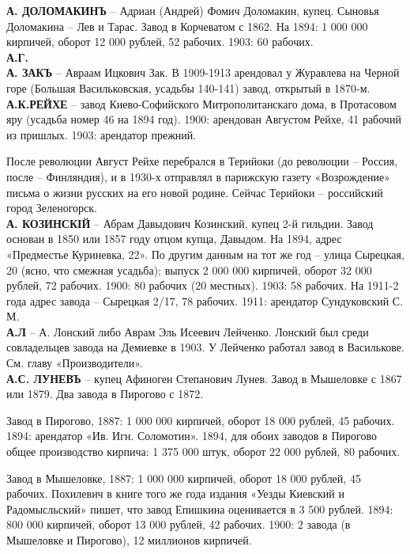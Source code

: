 \noindent\textbf{А. ДОЛОМАКИНЪ} – Адриан (Андрей) Фомич Доломакин, купец. Сыновья Доломакина – Лев и Тарас. Завод в Корчеватом с 1862. На 1894: 1 000 000 кирпичей, оборот 12 000 рублей, 52 рабочих. 1903: 60 рабочих.\\ 

\noindent\textbf{А.Г.}\\

\noindent\textbf{А. ЗАКЪ} – Авраам Ицкович Зак. В 1909-1913 арендовал у Журавлева на Черной горе (Большая Васильковская, усадьбы 140-141) завод, открытый в 1870-м.\\

\noindent\textbf{А.К.РЕЙХЕ} – завод Киево-Софийского Митрополитанскаго дома, в Протасовом яру (усадьба номер 46 на 1894 год). 1900: арендован Августом Рейхе, 41 рабочий из пришлых. 1903: арендатор прежний.

После революции Август Рейхе перебрался в Терийоки (до революции – Россия, после – Финляндия), и в 1930-х отправлял в парижскую газету «Возрождение» письма о жизни русских на его новой родине. Сейчас Терийоки – российский город Зеленогорск.\\

\noindent\textbf{А. КОЗИНСКІЙ} – Абрам Давыдович Козинский, купец 2-й гильдии. Завод основан в 1850 или 1857 году отцом купца, Давыдом. На 1894, адрес «Предместье Куриневка, 22». По другим данным на тот же год – улица Сырецкая, 20 (ясно, что смежная усадьба); выпуск 2 000 000 кирпичей, оборот 32 000 рублей, 72 рабочих. 1900: 80 рабочих (20 местных). 1903: 58 рабочих. На 1911-2 года адрес завода – Сырецкая 2/17, 78 рабочих. 1911: арендатор Сундуковский С. М.\\

\noindent\textbf{А.Л} – А. Лонский либо Аврам Эль Исеевич Лейченко. Лонский был среди совладельцев завода на Демиевке в 1903. У Лейченко работал завод в Василькове. См. главу «Производители».\\

\noindent\textbf{А.С. ЛУНЕВЪ} – купец Афиноген Степанович Лунев. Завод в Мышеловке с 1867 или 1879. Два завода в Пирогово с 1872. 

Завод в Пирогово, 1887: 1 000 000 кирпичей, оборот 18 000 рублей, 45 рабочих. 1894: арендатор «Ив. Игн. Соломотин». 1894, для обоих заводов в Пирогово общее производство кирпича: 1 375 000 штук, оборот 22 000 рублей, 80 рабочих.

Завод в Мышеловке, 1887: 1 000 000 кирпичей, оборот 18 000 рублей, 45 рабочих. Похилевич в книге того же года издания «Уезды Киевский и Радомысльский»\cite{pohyluezd} пишет, что завод Епишкина оценивается в 3 500 рублей. 1894: 800 000 кирпичей, оборот 13 000 рублей, 42 рабочих. 1900: 2 завода (в Мышеловке и Пирогово), 12 миллионов кирпичей.

